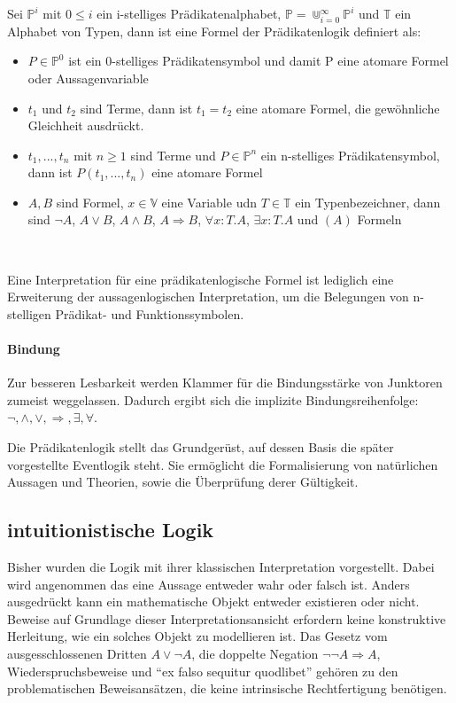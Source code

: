 \begin{defi}
  Sei $\mathbb{P}^i$ mit $0\le i$ ein i-stelliges Prädikatenalphabet,
  $\mathbb{P}=\Cup^{\infty}_{i=0}\mathbb{P}^i$ und $\mathbb{T}$ ein Alphabet von Typen,
  dann ist eine Formel der Prädikatenlogik definiert als:
  \begin{itemize}
  \item $P\in\mathbb{P}^0$ ist ein 0-stelliges Prädikatensymbol und damit P eine
    atomare Formel oder Aussagenvariable
  \item $t_1$ und $t_2$ sind Terme, dann ist $t_1 = t_2$ eine atomare Formel,
    die gewöhnliche Gleichheit ausdrückt.
  \item $t_1,...,t_n$ mit $n\geq1$ sind Terme und $P\in\mathbb{P}^n$ ein n-stelliges
    Prädikatensymbol, dann ist $P(t_1,...,t_n)$ eine atomare Formel
  \item $A,B$ sind Formel, $x\in\mathbb{V}$ eine Variable udn $T\in\mathbb{T}$ ein
    Typenbezeichner, dann sind $\neg A$, $A\vee B$, $A\wedge B$, $A\Rightarrow B$, $\forall x:T.A$, $\exists
    x:T.A$ und $(A)$ Formeln
  \end{itemize}
\end{defi}~\cite{kreitz1994automatisierte}

Eine Interpretation für eine prädikatenlogische Formel ist lediglich eine
Erweiterung der aussagenlogischen Interpretation, um die Belegungen von
n-stelligen Prädikat- und Funktionssymbolen.~\cite{heinemann2013logik}

\paragraph{Bindung}
Zur besseren Lesbarkeit werden Klammer für die Bindungsstärke von Junktoren
zumeist weggelassen. Dadurch ergibt sich die implizite Bindungsreihenfolge:
$\neg,\wedge,\vee,\Rightarrow,\exists,\forall$.~\cite{kreitz1994automatisierte}

Die Prädikatenlogik stellt das Grundgerüst, auf dessen Basis die später
vorgestellte Eventlogik steht. Sie ermöglicht die Formalisierung von natürlichen
Aussagen und Theorien, sowie die Überprüfung derer Gültigkeit.


\subsection{intuitionistische Logik}
Bisher wurden die Logik mit ihrer klassischen Interpretation vorgestellt.
Dabei wird angenommen das eine Aussage entweder wahr oder falsch ist.
Anders ausgedrückt kann ein mathematische Objekt entweder existieren oder
nicht. Beweise auf Grundlage dieser Interpretationsansicht erfordern keine
konstruktive Herleitung, wie ein solches Objekt zu modellieren ist.
Das Gesetz vom ausgesschlossenen Dritten $A\vee\neg A$, die doppelte Negation $\neg\neg A\Rightarrow
A$, Wiederspruchsbeweise und "`ex falso sequitur quodlibet"' gehören zu den
problematischen Beweisansätzen, die keine intrinsische Rechtfertigung
benötigen.~\cite{sep-logic-intuitionistic}


